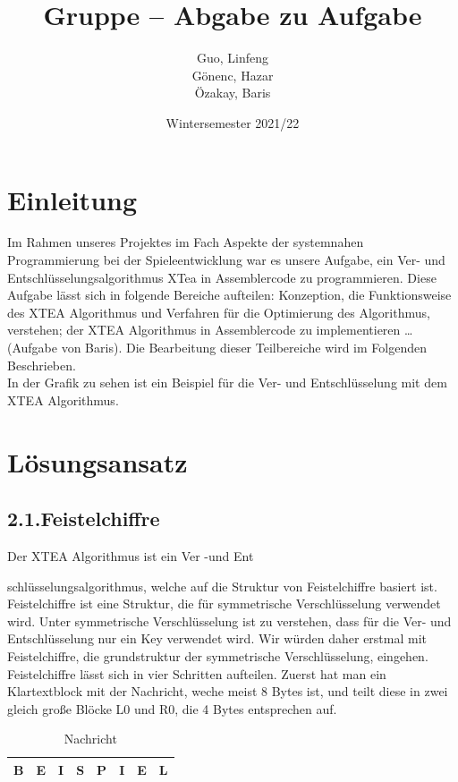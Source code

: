 \documentclass[course=asp]{aspdoc}
\author{Guo, Linfeng\\Gönenc, Hazar \\Özakay, Baris}
\date{Wintersemester 2021/22}
\title{Gruppe \theGroup{} -- Abgabe zu Aufgabe \theNumber}
\begin{document}
\maketitle



\section{Einleitung}
Im Rahmen unseres Projektes im Fach Aspekte der systemnahen Programmierung bei der Spieleentwicklung war es unsere Aufgabe, ein Ver- und Entschlüsselungsalgorithmus XTea in Assemblercode zu programmieren. Diese Aufgabe lässt sich in folgende Bereiche aufteilen: Konzeption, die Funktionsweise des XTEA Algorithmus und Verfahren für die Optimierung des Algorithmus, verstehen; der XTEA Algorithmus in Assemblercode zu implementieren …(Aufgabe von Baris). Die Bearbeitung dieser Teilbereiche wird im Folgenden Beschrieben.  \\In der Grafik zu sehen ist ein Beispiel für die Ver- und Entschlüsselung mit dem XTEA Algorithmus.  

\newpage
\section{Lösungsansatz}
\subsection*{2.1.Feistelchiffre }
Der XTEA Algorithmus ist ein Ver -und Ent

schlüsselungsalgorithmus, welche auf die Struktur von Feistelchiffre basiert ist. Feistelchiffre ist eine Struktur, die für symmetrische Verschlüsselung verwendet wird. Unter symmetrische Verschlüsselung ist zu verstehen, dass für die Ver- und Entschlüsselung nur ein Key verwendet wird. Wir würden daher erstmal mit Feistelchiffre, die grundstruktur der symmetrische Verschlüsselung, eingehen.\\
Feistelchiffre lässt sich in vier Schritten aufteilen. Zuerst hat man ein Klartextblock mit der Nachricht, weche meist 8 Bytes ist, und teilt diese in zwei gleich große Bl\"ocke L0 und R0, die 4 Bytes entsprechen auf.

\begin{table}[H]
\centering 
    \begin{tabular}{|l|l|l|l|l|l|l|l|}
        \hline
        B & E & I & S & P & I & E & L   \\
        \hline
    \end{tabular}
    \caption{Nachricht}
\end{table}
\end{document}
